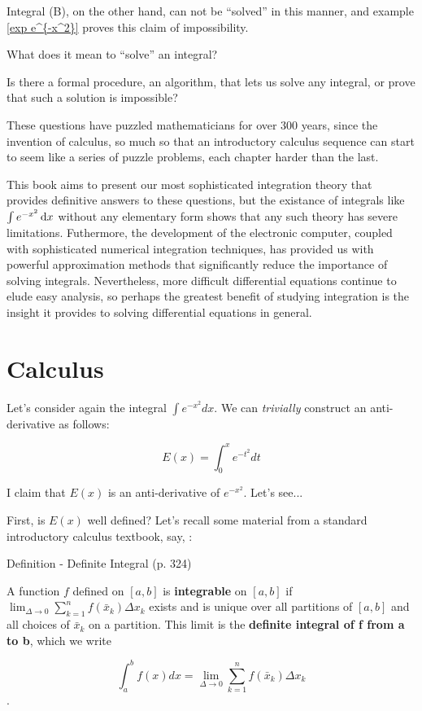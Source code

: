 Integral (B), on the other hand, can not be ``solved'' in
this manner, and example \ref{exp e^{-x^2}} proves this
claim of impossibility.

What does it mean to ``solve'' an integral?

Is there a formal procedure, an algorithm, that lets us solve
any integral, or prove that such a solution is impossible?

These questions have puzzled mathematicians for over 300 years, since
the invention of calculus, so much so that an introductory calculus
sequence can start to seem like a series of puzzle problems, each
chapter harder than the last.

This book aims to present our most sophisticated integration theory
that provides definitive answers to these questions, but the existance
of integrals like $\int e^{-x^2} \,\mathrm{d} x$ without any elementary form shows that any such theory has
severe limitations.  Futhermore, the development of the electronic
computer, coupled with sophisticated numerical integration techniques,
has provided us with powerful approximation methods that significantly
reduce the importance of solving integrals.  Nevertheless, more
difficult differential equations continue to elude easy analysis, so
perhaps the greatest benefit of studying integration is the insight it
provides to solving differential equations in general.

\vfill\eject
\section{Calculus}
Let's consider again the integral $\int e^{-x^2} dx$.  We can {\it trivially} construct
an anti-derivative as follows:

$$E(x) = \int_0^x e^{-t^2} dt$$

I claim that $E(x)$ is an anti-derivative of $e^{-x^2}$.  Let's see...

First, is $E(x)$ well defined?  Let's recall some material from a standard
introductory calculus textbook, say, \cite{briggs}:

\begin{framed}
\cite{briggs} Definition - Definite Integral (p. 324)

A function $f$ defined on $[a,b]$ is {\bf integrable} on $[a,b]$ if $\lim_{\Delta\to0}\sum_{k=1}^{n}f(\bar{x}_k)\Delta x_k$
exists and is unique over all partitions of $[a,b]$ and all choices of $\bar{x}_k$ on a partition.
This limit is the {\bf definite integral of f from a to b}, which we write

$$\int_a^b f(x) dx = \lim_{\Delta\to0}\sum_{k=1}^{n}f(\bar{x}_k)\Delta x_k $$.
\end{framed}

